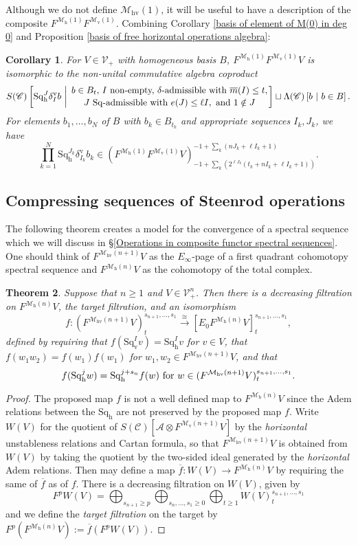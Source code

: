 \documentclass[11pt]{amsart} \renewcommand{\baselinestretch}{1.2}
\theoremstyle{plain}
\newtheorem{thm}{Theorem}[section] %
\newtheorem{cor}[thm]{Corollary}
\numberwithin{equation}{section} %
\theoremstyle{plain}
\newtheorem{thm}{Theorem}[chapter] %
\newtheorem{cor}[thm]{Corollary}
\numberwithin{equation}{chapter} %
\renewcommand{\to}{\longrightarrow}
\newcommand{\scrC}{\mathscr{C}}
\newcommand{\calA}{\mathcal{A}}
\newcommand{\calV}{\mathcal{V}}
\newcommand{\calMv}{\mathcal{M}\dver}
\newcommand{\calMh}{\mathcal{M}\dhor}
\newcommand{\calMhv}{\mathcal{M}_\mathrm{hv}}
\newcommand{\CommOperad}{{\scrC}}
\newcommand{\vect}[2]{\calV^{#1}_{#2}}
\newcommand{\minDimP}{\overline{m}}
\newcommand{\excess}{e}
\newcommand{\Sq}{\mathrm{Sq}}
\newcommand{\LieSteen}{\calA}
\newcommand{\Edown}[4]{[E_{#1}#2]^{#3}_{#4}}
\newcommand{\uver}{^\mathrm{v}}
\newcommand{\dver}{_\mathrm{v}}
\newcommand{\dhor}{_\mathrm{h}}
\newcommand{\Sqh}{\mathrm{Sq}\dhor}
\newcommand{\Sqv}{\mathrm{Sq}\dver}
\newcommand{\deltav}{\delta\uver}
\newcommand{\SubsectionOrSection}[1]{\subsection{#1}}
\begin{document}
\begin{Cohomology Operations for W and U}
Although we do not define $\calMhv(1)$, it will be useful to have a description of the composite $F^{\calMh(1)}F^{\calMv(1)}$.
Combining Corollary \ref{basis of element of M(0) in deg 0} and Proposition \ref{basis of free horizontal operations algebra}:

\begin{cor}
\label{calMhv(1) description}
For $V\in\vect{}{+}$ with homogeneous basis $B$, $F^{\calMh(1)}F^{\calMv(1)} V$ is isomorphic to the non-unital commutative algebra coproduct
\[S(\CommOperad) \left[\Sqh^J\deltav_Ib\ \middle|\ \genfrac{}{}{0pt}{}{b\in B_t\textup{, $I$ non-empty, $\delta$-admissible with }\minDimP(I)\leq t,}{\textup{$J$ $\Sq$-admissible with }\excess(J)\leq \ell I,\textup{ and }1\notin J}\right]\sqcup \Lambda(\CommOperad)\left[b\ \middle|\ b\in B\right].\]
For elements $b_1,\ldots,b_N$ of $B$ with $b_k\in B_{t_k}$ and appropriate sequences $I_k,J_k$, we have
\[\textstyle\prod_{k=1}^N \Sqh^{J_k}\deltav_{I_k}b_k\in \left(F^{\calMh(1)}F^{\calMv(1)}V\right)^{-1+\sum_k(nJ_k+\ell I_k+1)}_{-1+\sum_k(2^{\ell J_k}(t_k+n I_k+\ell I_k+1))}.\]
\end{cor}

\SubsectionOrSection{Compressing sequences of Steenrod operations}
The following theorem creates a model for the convergence of a spectral sequence which we will discuss in \S\ref{Operations in composite functor spectral sequences}. One should think of $F^{\calMhv(n+1)}V$ as the $E_\infty$-page of  a first quadrant cohomotopy spectral sequence and $F^{\calMh(n)}V$ as the cohomotopy of the total complex.
\begin{thm}
\label{thm on compressing seqs of steenrod ops}
Suppose that $n\geq1$ and $V\in \vect{n}{+}$. Then there is a decreasing filtration on $F^{\calMh(n)}V$, the \emph{target filtration}, and an isomorphism
\[ f:(F^{\calMhv(n+1)}V)^{s_{n+1},\ldots,s_1}_t\overset{\cong}{\to} \Edown{0}{F^{\calMh(n)}V}{s_{n+1},\ldots,s_1}{t},\]
defined by requiring that
$f(\Sqv^Iv)=\Sqh^Iv$ for $v\in V$, that $f(w_1w_2)=f(w_1)f(w_1)$ for $w_1,w_2\in F^{\calMhv(n+1)}V$,
and that
\[f(\Sqh^jw)=\Sqh^{j+s_n}f(w)\textup{ for }w\in (F^{\calMhv(n+1)}V)^{s_{n+1},\ldots,s_1}_t.\]
\end{thm}
\begin{proof}
The proposed map $f$ is not a well defined map to $F^{\calMh(n)}V$ since the Adem relations between the $\Sqh$ are not preserved by the proposed map $f$. Write $W(V)$ for the quotient of $S(\CommOperad)[\LieSteen\otimes F^{\calMv(n+1)}V]$ by the \emph{horizontal} unstableness relations and Cartan formula, so that $F^{\calMhv(n+1)}V$ is obtained from $W(V)$ by taking the quotient by the two-sided ideal generated by the \emph{horizontal} Adem relations. Then may define a map $\overline{f}:W(V)\to F^{\calMh(n)}V$ by requiring the same of $\overline{f}$ as of $f$. There is a decreasing filtration on $W(V)$, given by 
\[F^pW(V)=\bigoplus_{s_{n+1}\geq p}\bigoplus_{s_n,\ldots,s_1\geq0}\bigoplus_{t\geq1}W(V)^{s_{n+1},\ldots,s_1}_t\]
 and we define the \emph{target filtration} on the target by $F^p(F^{\calMh(n)}V):=\overline{f}(F^pW(V))$.


\end{proof}
\end{Cohomology Operations for W and U}
\end{document}

